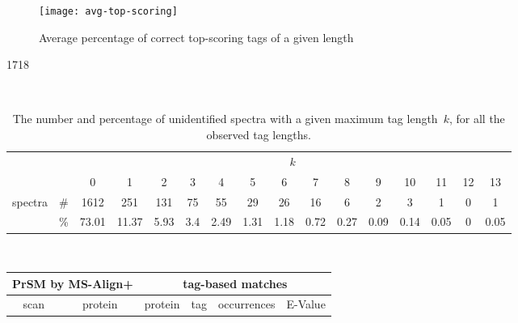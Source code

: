 \documentclass{article}[12pt]
\begin{document}
\begin{figure}
  \begin{center}
\texttt{[image: avg-top-scoring]}
\end{center}
\caption{Average percentage of correct top-scoring tags of a given length}
  \label{fig:avg-top-scoring}
\end{figure}





\begin{landscape}

1718
\begin{table}[h]
\vspace{3mm}\
{\centering
\begin{center}
\begin{tabular}{|c|c|
c|c|c|c|c|c|c|c|c|c|c|c|c|c|}
  \hline
  \multicolumn{2}{|c|}{} & \multicolumn{ 14}{|c|}{$k$} \\
  \cline{3-16}
  \multicolumn{2}{|c|}{} 
 & 0 & 1 & 2 & 3 & 4 & 5 & 6 & 7 & 8 & 9 & 10 & 11 & 12 & 13\\
  \hline
  \multirow{2}{*}{spectra} & \#
 & 1612 & 251 & 131 & 75 & 55 & 29 & 26 & 16 & 6 & 2 & 3 & 1 & 0 & 1\\
   & \%
 & 73.01 & 11.37 & 5.93 & 3.4 & 2.49 & 1.31 & 1.18 & 0.72 & 0.27 & 0.09 & 0.14 & 0.05 & 0 & 0.05\\
  \hline
\end{tabular}
\end{center}
\par}
\centering
\caption{The number and percentage of unidentified spectra with a given maximum tag length~$k$, for all the observed tag lengths.}
\vspace{3mm}
\label{table:unident-tags}
\end{table}


\begin{table}[h]\footnotesize
\vspace{3mm}\
{\centering
\begin{center}
\begin{tabular}{|c|c||c|c|c|c|}
  \hline
  \multicolumn{2}{|c||}{PrSM by MS-Align+} & \multicolumn{4}{|c|}{tag-based matches} \\
  \hline
  scan & protein & protein & tag & occurrences & E-Value\\


\end{tabular}
\end{center}}
\end{table}
\end{landscape}
\end{document}
